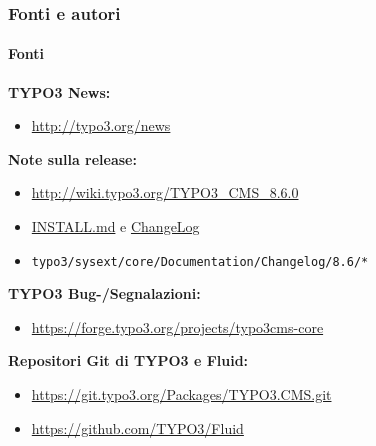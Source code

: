 \begin{frame}[fragile]
	\frametitle{Fonti e autori}
	\framesubtitle{Fonti}

	\textbf{TYPO3 News:}
		\begin{itemize}\smaller
			\item \url{http://typo3.org/news}
		\end{itemize}

	\textbf{Note sulla release:}
		\begin{itemize}\smaller
			\item \url{http://wiki.typo3.org/TYPO3_CMS_8.6.0}
			\item \href{https://github.com/TYPO3/TYPO3.CMS/blob/master/INSTALL.md}{INSTALL.md}
				e \href{https://github.com/TYPO3/TYPO3.CMS/tree/master/typo3/sysext/core/Documentation/Changelog}{ChangeLog}
			\item \texttt{typo3/sysext/core/Documentation/Changelog/8.6/*}
		\end{itemize}

	\textbf{TYPO3 Bug-/Segnalazioni:}
		\begin{itemize}\smaller
			\item \url{https://forge.typo3.org/projects/typo3cms-core}
		\end{itemize}

	\textbf{Repositori Git di TYPO3 e Fluid:}
		\begin{itemize}\smaller
			\item \url{https://git.typo3.org/Packages/TYPO3.CMS.git}
			\item \url{https://github.com/TYPO3/Fluid}
		\end{itemize}

\end{frame}


